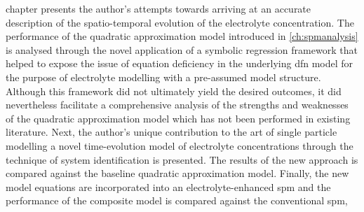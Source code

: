 

 chapter presents the  author's attempts towards arriving at
an  accurate description  of the  spatio-temporal evolution  of the  electrolyte
concentration. The  performance of the quadratic  approximation model introduced
in \cref{ch:spmanalysis} is analysed through the novel application of a symbolic
regression framework that  helped to expose the issue of  equation deficiency in
the underlying \gls{dfn}  model for the purpose of electrolyte  modelling with a
pre-assumed model  structure. Although this  framework did not  ultimately yield
the desired outcomes, it did nevertheless facilitate a comprehensive analysis of
the strengths and weaknesses of the  quadratic approximation model which has not
been performed in existing literature. Next, the author's unique contribution to
the art  of single  particle modelling  \viz{} a  novel time-evolution  model of
electrolyte  concentrations through  the technique  of system  identification is
presented. The  results of  the new  approach is  compared against  the baseline
quadratic approximation model. Finally, the new model equations are incorporated
into  an electrolyte-enhanced  \gls{spm} and  the performance  of the  composite
model is compared against the conventional \gls{spm},


